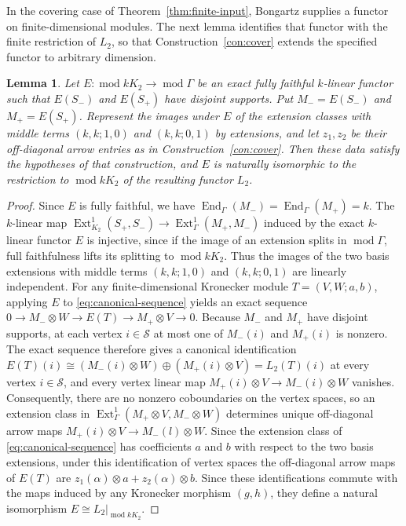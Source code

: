 \documentclass[a4paper,reqno,10pt]{amsart}
\newtheorem{lemma}[theorem]{Lemma}
\theoremstyle{definition}
\DeclareMathOperator{\End}{End}
\DeclareMathOperator{\Ext}{Ext}
\DeclareMathOperator{\md}{mod}
\numberwithin{equation}{section}
\begin{document}
In the covering case of Theorem~\ref{thm:finite-input}, Bongartz supplies
a functor on finite-dimensional modules. The next lemma identifies that functor with the finite restriction
of $L_2$, so that Construction~\ref{con:cover} extends the specified
functor to arbitrary dimension.
\begin{lemma}\label{lem:L2-identification}
Let $E:\md kK_2\to\md\Gamma$ be an exact fully faithful $k$-linear
functor such that $E(S_-)$ and $E(S_+)$ have disjoint supports.
Put $M_-=E(S_-)$ and $M_+=E(S_+)$. Represent the images under $E$ of
the extension classes with middle terms $(k,k;1,0)$ and $(k,k;0,1)$
by extensions, and let $z_1,z_2$ be their off-diagonal arrow entries
as in Construction~\ref{con:cover}.
Then these data satisfy the hypotheses of that construction, and $E$
is naturally isomorphic to the restriction to $\md kK_2$ of the
resulting functor $L_2$.
\end{lemma}
\begin{proof}
Since $E$ is fully faithful, we have $\End_\Gamma(M_-)=\End_\Gamma(M_+)=k$.
The $k$-linear map $\Ext^1_{K_2}(S_+,S_-)\to\Ext^1_\Gamma(M_+,M_-)$ induced by the exact $k$-linear functor
$E$ is injective, since if the image of an extension splits in $\md\Gamma$, full
faithfulness lifts its splitting to $\md kK_2$. Thus the images of the two basis extensions with middle terms $(k,k;1,0)$ and $(k,k;0,1)$ are linearly independent.
For any finite-dimensional Kronecker module $T=(V,W;a,b)$, applying $E$ to \eqref{eq:canonical-sequence} yields an exact sequence
$0\to M_-\otimes W\to E(T)\to M_+\otimes V\to0$.
Because $M_-$ and $M_+$ have disjoint supports, at each vertex $i\in\mathcal S$ at most one of $M_-(i)$ and $M_+(i)$ is nonzero. The exact sequence therefore gives a canonical identification
$E(T)(i)\cong(M_-(i)\otimes W)\oplus(M_+(i)\otimes V)=L_2(T)(i)$ at every vertex $i\in\mathcal S$, and every vertex linear map
$M_+(i)\otimes V\to M_-(i)\otimes W$ vanishes. Consequently, there are no nonzero coboundaries on the vertex spaces, so an extension class in $\Ext^1_\Gamma(M_+\otimes V,M_-\otimes W)$ determines unique off-diagonal arrow maps $M_+(i)\otimes V\to M_-(l)\otimes W$.
Since the extension class of \eqref{eq:canonical-sequence} has coefficients $a$ and $b$
with respect to the two basis extensions, under this identification of vertex spaces the off-diagonal arrow maps of $E(T)$ are
$z_1(\alpha)\otimes a+z_2(\alpha)\otimes b$. Since these identifications commute with the maps induced by any
Kronecker morphism $(g,h)$, they define a natural isomorphism $E\cong L_2|_{\md kK_2}$.
\end{proof}
\end{document}
